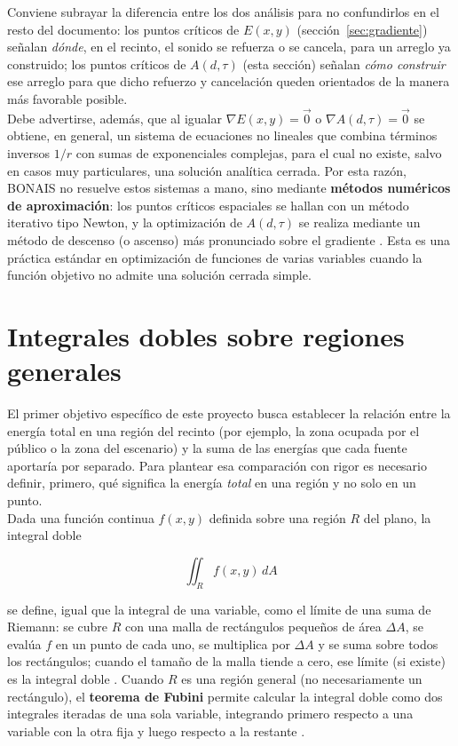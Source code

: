 \noindent Conviene subrayar la diferencia entre los dos análisis para no
confundirlos en el resto del documento: los puntos críticos de
\(E(x,y)\) (sección~\ref{sec:gradiente}) señalan \emph{dónde}, en el
recinto, el sonido se refuerza o se cancela, para un arreglo ya
construido; los puntos críticos de \(A(d,\tau)\) (esta sección) señalan
\emph{cómo construir} ese arreglo para que dicho refuerzo y
cancelación queden orientados de la manera más favorable posible.\\

\noindent Debe advertirse, además, que al igualar \(\nabla E(x,y)=\vec{0}\) o
\(\nabla A(d,\tau)=\vec{0}\) se obtiene, en general, un sistema de
ecuaciones no lineales que combina términos inversos \(1/r\) con sumas
de exponenciales complejas, para el cual no existe, salvo en casos muy
particulares, una solución analítica cerrada. Por esta razón, BONAIS
no resuelve estos sistemas a mano, sino mediante \textbf{métodos
numéricos de aproximación}: los puntos críticos espaciales se hallan
con un método iterativo tipo Newton, y la optimización de
\(A(d,\tau)\) se realiza mediante un método de descenso (o ascenso)
más pronunciado sobre el gradiente \cite{chongzak2013}. Esta es una
práctica estándar en optimización de funciones de varias variables
cuando la función objetivo no admite una solución cerrada simple.

\section{Integrales dobles sobre regiones generales}
\label{sec:integrales_dobles}

El primer objetivo específico de este proyecto busca establecer la
relación entre la energía total en una región del recinto (por
ejemplo, la zona ocupada por el público o la zona del escenario) y la
suma de las energías que cada fuente aportaría por separado. Para
plantear esa comparación con rigor es necesario definir, primero, qué
significa la energía \emph{total} en una región y no solo en un punto.\\

\noindent Dada una función continua \(f(x,y)\) definida sobre una región \(R\) del
plano, la integral doble

\begin{equation}
\iint_R f(x,y)\, dA
\end{equation}

\noindent se define, igual que la integral de una variable, como el límite de
una suma de Riemann: se cubre \(R\) con una malla de rectángulos
pequeños de área \(\Delta A\), se evalúa \(f\) en un punto de cada uno, se
multiplica por \(\Delta A\) y se suma sobre todos los rectángulos;
cuando el tamaño de la malla tiende a cero, ese límite (si existe) es
la integral doble
\cite[cap.~15]{stewart2018}\cite[cap.~13]{larson2015}\cite[cap.~11]{apostol}.
Cuando \(R\) es una región general (no necesariamente un rectángulo), el
\textbf{teorema de Fubini} permite calcular la integral doble como dos
integrales iteradas de una sola variable, integrando primero respecto
a una variable con la otra fija y luego respecto a la restante
\cite[pág.~982]{stewart2018}\cite[pág.~1210]{larson2015}\cite[pág.~348]{apostol}.\\

